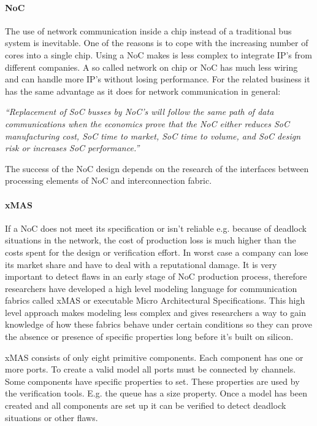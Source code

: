 \paragraph{NoC}

The use of network communication inside a chip instead of a traditional bus
system is inevitable. One of the reasons is to cope with the increasing number
of cores into a single chip. Using a NoC makes is less complex to integrate IP's from
different companies. A so called network on chip or NoC has much less wiring
\cite{NoC-busses} and can handle more IP's without losing performance. For the
related business it has the same advantage as it does for network communication
in general:

\textit{``Replacement of SoC busses by NoC's will follow the same path of data
communications when the economics prove that the NoC either reduces SoC
manufacturing cost, SoC time to market, SoC time to volume, and SoC design risk
or increases SoC performance.''} \cite{NoC-busses} 

The success of the NoC design depends on the research of the interfaces between
processing elements of NoC and interconnection fabric.

\paragraph{xMAS}

If a NoC does not meet its specification or isn't reliable e.g. because of
deadlock situations in the network, the cost of production loss is much higher
than the costs spent for the design or verification effort. In worst case a
company can lose its market share and have to deal with a reputational damage.
It is very important to detect flaws in an early stage of NoC production
process, therefore researchers have developed a high level modeling language for
communication fabrics called xMAS or executable Micro Architectural
Specifications. This high level approach makes modeling less complex and gives
researchers a way to gain knowledge of how these fabrics behave under certain
conditions so they can prove the absence or presence of specific properties long
before it's built on silicon.

xMAS consists of only eight primitive components. Each component has one or more
ports. To create a valid model all ports must be connected by channels. Some
components have specific properties to set. These properties are used by the
verification tools. E.g. the queue has a size property. Once a model has been
created and all components are set up it can be verified to detect deadlock
situations or other flaws.

